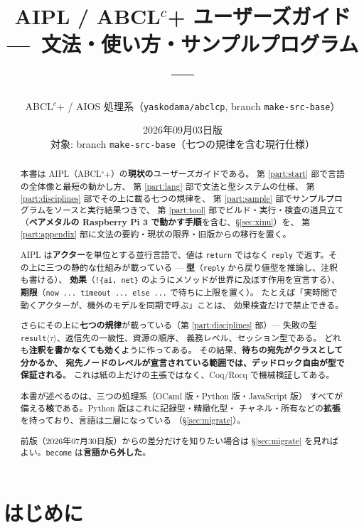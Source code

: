 \documentclass[11pt,a4paper]{ltjsarticle}
\title{AIPL / ABCL$^{c}$+ ユーザーズガイド\\
{\large ---\ 文法・使い方・サンプルプログラム ---}}
\author{ABCL$^{c}$+ / AIOS 処理系（\texttt{yaskodama/abclcp}, branch \texttt{make-src-base}）}
\date{2026年09月03日版\\{\small 対象: branch \texttt{make-src-base}（七つの規律を含む現行仕様）}}
\begin{document}
\maketitle

\begin{abstract}
本書は AIPL（ABCL$^{c}$+）の\textbf{現状の}ユーザーズガイドである。
第 \ref{part:start} 部で言語の全体像と最短の動かし方、
第 \ref{part:lang} 部で文法と型システムの仕様、
第 \ref{part:disciplines} 部でその上に載る七つの規律を、
第 \ref{part:sample} 部でサンプルプログラムをソースと実行結果つきで、
第 \ref{part:tool} 部でビルド・実行・検査の道具立て（\textbf{ベアメタルの Raspberry Pi 3 で動かす手順}を含む、\S\ref{sec:xinu}）を、
第 \ref{part:appendix} 部に文法の要約・現状の限界・旧版からの移行を置く。

AIPL は\textbf{アクター}を単位とする並行言語で、値は \texttt{return} ではなく
\texttt{reply} で返す。その上に三つの静的な仕組みが載っている ---
\textbf{型}（\texttt{reply} から戻り値型を推論し、注釈も書ける）、
\textbf{効果}（\texttt{!\{ai, net\}} のようにメソッドが世界に及ぼす作用を宣言する）、
\textbf{期限}（\texttt{now ... timeout ... else ...} で待ちに上限を置く）。
たとえば「実時間で動くアクターが、機外のモデルを同期で呼ぶ」ことは、
効果検査だけで禁止できる。

さらにその上に\textbf{七つの規律}が載っている（第 \ref{part:disciplines} 部）---
失敗の型 \texttt{result}$\langle\tau\rangle$、返信先の一級性、資源の順序、
義務レベル、セッション型である。
どれも\textbf{注釈を書かなくても効く}ように作ってある。
その結果、\textbf{待ちの宛先がクラスとして分かるか、
宛先ノードのレベルが宣言されている範囲では、デッドロック自由が型で保証される}。
これは紙の上だけの主張ではなく、Coq/Rocq で機械検証してある。

本書が述べるのは、三つの処理系（OCaml 版・Python 版・JavaScript 版）
すべてが備える\textbf{核}である。Python 版はこれに記録型・精緻化型・
チャネル・所有などの\textbf{拡張}を持っており、言語は二層になっている
（\S\ref{sec:migrate}）。

前版（2026年07月30日版）からの差分だけを知りたい場合は
\S\ref{sec:migrate} を見ればよい。\texttt{become} は\textbf{言語から外した}。
\end{abstract}

\tableofcontents

\part{はじめに}
\label{part:start}
\end{document}
